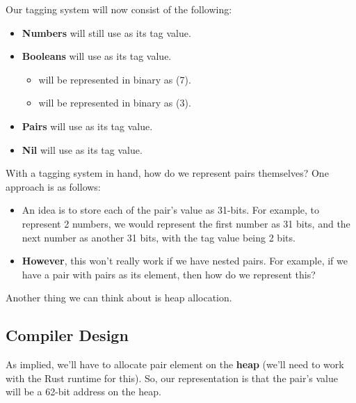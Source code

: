 Our tagging system will now consist of the following:
\begin{itemize}
    \item \textbf{Numbers} will still use  as its tag value.
    \item \textbf{Booleans} will use  as its tag value. 
    \begin{itemize}
        \item {} will be represented in binary as  (7).
        \item {} will be represented in binary as  (3).
    \end{itemize}
    \item \textbf{Pairs} will use  as its tag value. 
    \item \textbf{Nil} will use  as its tag value.
\end{itemize}
With a tagging system in hand, how do we represent pairs themselves? One approach is as follows: 
\begin{itemize}
    \item An idea is to store each of the pair's value as 31-bits. For example, to represent 2 numbers, we would represent the first number as 31 bits, and the next number as another 31 bits, with the tag value being 2 bits. 
    \item \textbf{However}, this won't really work if we have nested pairs. For example, if we have a pair with pairs as its element, then how do we represent this? 
\end{itemize}
Another thing we can think about is heap allocation. 

\subsection{Compiler Design}
As implied, we'll have to allocate pair element on the \textbf{heap} (we'll need to work with the Rust runtime for this). So, our representation is that the pair's value will be a 62-bit address on the heap. 

\bigskip 

